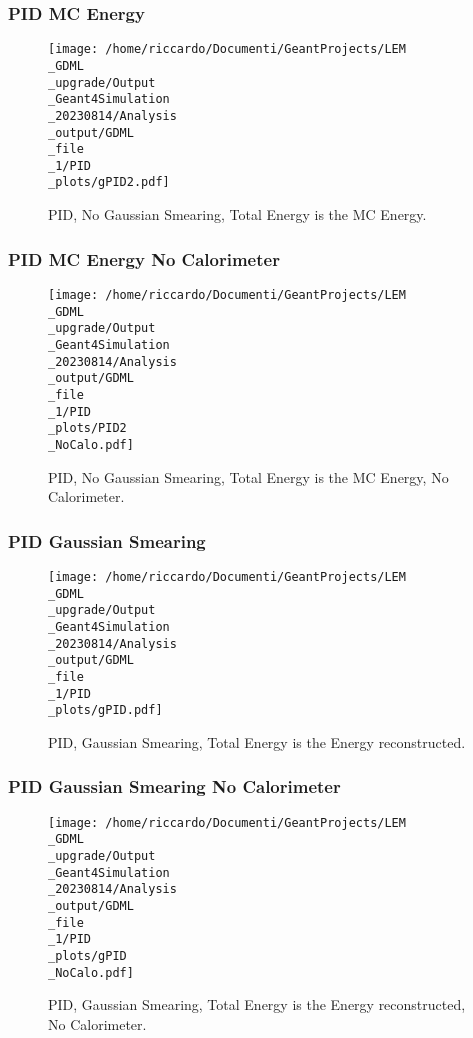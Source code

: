 \documentclass[8pt]{beamer}
\begin{document}
            \begin{frame}
                \frametitle{PID MC Energy}
            
        \begin{figure}[h]
            \centering
            \texttt{[image: /home/riccardo/Documenti/GeantProjects/LEM\\\_GDML\\\_upgrade/Output\\\_Geant4Simulation\\\_20230814/Analysis\\\_output/GDML\\\_file\\\_1/PID\\\_plots/gPID2.pdf]}
            \caption{PID, No Gaussian Smearing, Total Energy is the MC Energy.}
        \end{figure}
        
            \end{frame}
            
            \begin{frame}
                \frametitle{PID MC Energy No Calorimeter}
            
        \begin{figure}[h]
            \centering
            \texttt{[image: /home/riccardo/Documenti/GeantProjects/LEM\\\_GDML\\\_upgrade/Output\\\_Geant4Simulation\\\_20230814/Analysis\\\_output/GDML\\\_file\\\_1/PID\\\_plots/PID2\\\_NoCalo.pdf]}
            \caption{PID, No Gaussian Smearing, Total Energy is the MC Energy, No Calorimeter.}
        \end{figure}
        
            \end{frame}
            
            \begin{frame}
                \frametitle{PID Gaussian Smearing}
            
        \begin{figure}[h]
            \centering
            \texttt{[image: /home/riccardo/Documenti/GeantProjects/LEM\\\_GDML\\\_upgrade/Output\\\_Geant4Simulation\\\_20230814/Analysis\\\_output/GDML\\\_file\\\_1/PID\\\_plots/gPID.pdf]}
            \caption{PID, Gaussian Smearing, Total Energy is the Energy reconstructed.}
        \end{figure}
        
            \end{frame}
            
            \begin{frame}
                \frametitle{PID Gaussian Smearing No Calorimeter}
            
        \begin{figure}[h]
            \centering
            \texttt{[image: /home/riccardo/Documenti/GeantProjects/LEM\\\_GDML\\\_upgrade/Output\\\_Geant4Simulation\\\_20230814/Analysis\\\_output/GDML\\\_file\\\_1/PID\\\_plots/gPID\\\_NoCalo.pdf]}
            \caption{PID, Gaussian Smearing, Total Energy is the Energy reconstructed, No Calorimeter.}
        \end{figure}
        
            \end{frame}
            
\end{document}
